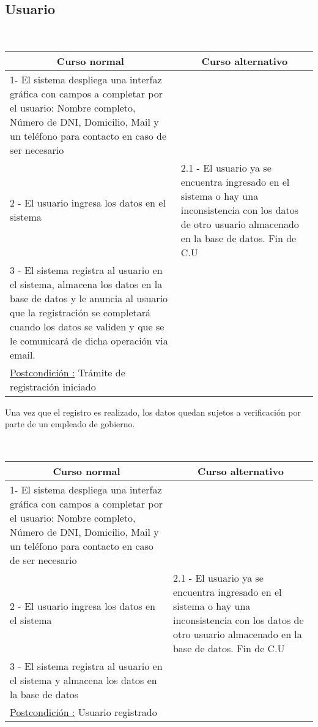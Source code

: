 \subsection{Usuario}

~


\begin{center}
    \centering
    \begin{tabular}{ | p{11cm} | p{6cm} | }
    	\multicolumn{1}{c}{\cellcolor{black!30}\textbf{Curso normal}} & 
    	\multicolumn{1}{c}{\cellcolor{black!30}\textbf{Curso alternativo}} \\
		\hline
		1- El sistema despliega una interfaz gráfica con campos a completar
		por el usuario: Nombre completo, Número de DNI, Domicilio, Mail y un teléfono
		para contacto en caso de ser necesario &  \\ \hline
		2 - El usuario ingresa los datos en el sistema & 2.1 - El usuario ya se encuentra ingresado en el sistema
		o hay una inconsistencia con los datos de otro usuario almacenado en la base de datos. Fin de C.U \\ \hline
		3 - El sistema registra al usuario en el sistema, almacena los datos en la base de datos y le anuncia al usuario que la registración se completará cuando los datos se validen y que se le comunicará de dicha operación via email.& \\ \hline
		\underline{Postcondición :} Trámite de registración iniciado & \\ \hline
    \end{tabular}
\end{center}

Una vez que el registro es realizado, los datos quedan sujetos a verificación por parte de un empleado de gobierno.

~

\begin{center}
    \centering
    \begin{tabular}{ | p{11cm} | p{6cm} | }
    	\multicolumn{1}{c}{\cellcolor{black!30}\textbf{Curso normal}} & 
    	\multicolumn{1}{c}{\cellcolor{black!30}\textbf{Curso alternativo}} \\
		\hline
		1- El sistema despliega una interfaz gráfica con campos a completar
		por el usuario: Nombre completo, Número de DNI, Domicilio, Mail y un teléfono
		para contacto en caso de ser necesario &  \\ \hline
		2 - El usuario ingresa los datos en el sistema & 2.1 - El usuario ya se encuentra ingresado en el sistema
		o hay una inconsistencia con los datos de otro usuario almacenado en la base de datos. Fin de C.U \\ \hline
		3 - El sistema registra al usuario en el sistema y almacena los datos en la base de datos & \\ \hline
		\underline{Postcondición :} Usuario registrado & \\ \hline
    \end{tabular}
\end{center}

